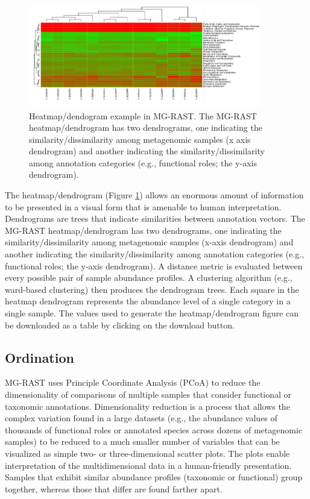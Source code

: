 \documentclass[12pt,fullpage]{report}
\begin{document}
\begin{figure}
\begin{center}
\includegraphics[width=4in]{Images/heatmap.png}
\end{center}
\caption{
Heatmap/dendogram example in MG-RAST. The MG-RAST heatmap/dendrogram has two dendrograms, one indicating the similarity/dissimilarity among metagenomic samples (x axis dendrogram) and another indicating the similarity/dissimilarity among annotation categories (e.g., functional roles; the y-axis dendrogram).
}
\label{fig:heatmap}
\end{figure}


The heatmap/dendrogram (Figure \ref{fig:heatmap}) allows an enormous amount of information to be presented in a visual form that is amenable to human interpretation. Dendrograms are trees that indicate similarities between annotation vectors. The MG-RAST heatmap/dendrogram has two dendrograms, one indicating the similarity/dissimilarity among metagenomic samples (x-axis dendrogram) and another indicating the similarity/dissimilarity among annotation categories (e.g., functional roles; the y-axis dendrogram). A distance metric is evaluated between every possible pair of sample abundance profiles. A clustering algorithm (e.g., ward-based clustering) then produces the dendrogram trees. Each square in the heatmap dendrogram represents the abundance level of a single category in a single sample. The values used to generate the heatmap/dendrogram figure can be downloaded as a table by clicking on the download button.
\subsection*{Ordination}

MG-RAST uses Principle Coordinate Analysis (PCoA) to reduce the dimensionality of comparisons of multiple samples that consider functional or taxonomic annotations.
Dimensionality reduction is a process that allows the complex variation found in a large datasets (e.g., the abundance values of thousands of functional roles or annotated species across dozens of metagenomic samples) to be reduced to a much smaller number of variables that can be visualized as simple two- or three-dimensional scatter plots. The plots enable interpretation of the multidimensional data in a human-friendly presentation. Samples that exhibit similar abundance profiles (taxonomic or functional) group together, whereas those that differ are found farther apart.
\end{document}
